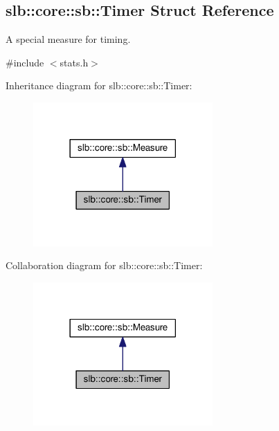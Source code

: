 \hypertarget{structslb_1_1core_1_1sb_1_1Timer}{}\subsection{slb\+:\+:core\+:\+:sb\+:\+:Timer Struct Reference}
\label{structslb_1_1core_1_1sb_1_1Timer}


A special measure for timing.  




{\ttfamily \#include $<$stats.\+h$>$}



Inheritance diagram for slb\+:\+:core\+:\+:sb\+:\+:Timer\+:\nopagebreak
\begin{figure}[H]
\begin{center}
\leavevmode
\includegraphics[width=194pt]{structslb_1_1core_1_1sb_1_1Timer__inherit__graph}
\end{center}
\end{figure}


Collaboration diagram for slb\+:\+:core\+:\+:sb\+:\+:Timer\+:\nopagebreak
\begin{figure}[H]
\begin{center}
\leavevmode
\includegraphics[width=194pt]{structslb_1_1core_1_1sb_1_1Timer__coll__graph}
\end{center}
\end{figure}
